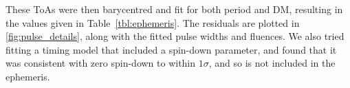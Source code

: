 \documentclass[fleqn,usenatbib]{mnras}
\newcommand{\Tab}{Table}
\begin{document}

These ToAs were then barycentred and fit for both period and DM, resulting in the values given in \Tab~\ref{tbl:ephemeris}.
The residuals are plotted in \ref{fig:pulse_details}, along with the fitted pulse widths and fluences.
We also tried fitting a timing model that included a spin-down parameter, and found that it was consistent with zero spin-down to within $1\sigma$, and so is not included in the ephemeris.
\end{document}

